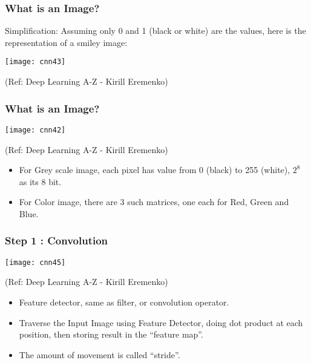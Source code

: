\begin{frame}[fragile] \frametitle{What is an Image?}
Simplification: Assuming only 0 and 1 (black or white) are the values, here is the representation of a smiley image:

\begin{center}
\texttt{[image: cnn43]}

\tiny{(Ref: Deep Learning A-Z - Kirill Eremenko)}
\end{center}



\end{frame}



\begin{frame}[fragile] \frametitle{What is an Image?}

\begin{center}
\texttt{[image: cnn42]}

\tiny{(Ref: Deep Learning A-Z - Kirill Eremenko)}
\end{center}

\begin{itemize}
\item For Grey scale image, each pixel has value from 0 (black) to 255 (white), $2^8$ as its 8 bit.
\item For Color image, there are 3 such matrices, one each for Red, Green and Blue.
\end{itemize}


\end{frame}


\begin{frame}[fragile] \frametitle{Step 1 : Convolution}

\begin{center}
\texttt{[image: cnn45]}

\tiny{(Ref: Deep Learning A-Z - Kirill Eremenko)}
\end{center}

\begin{itemize}
\item Feature detector, same as filter, or convolution operator.
\item Traverse the Input Image using Feature Detector, doing dot product at each position, then storing result in the ``feature map''.
\item The amount of movement is called ``stride''.
\end{itemize}
\end{frame}


